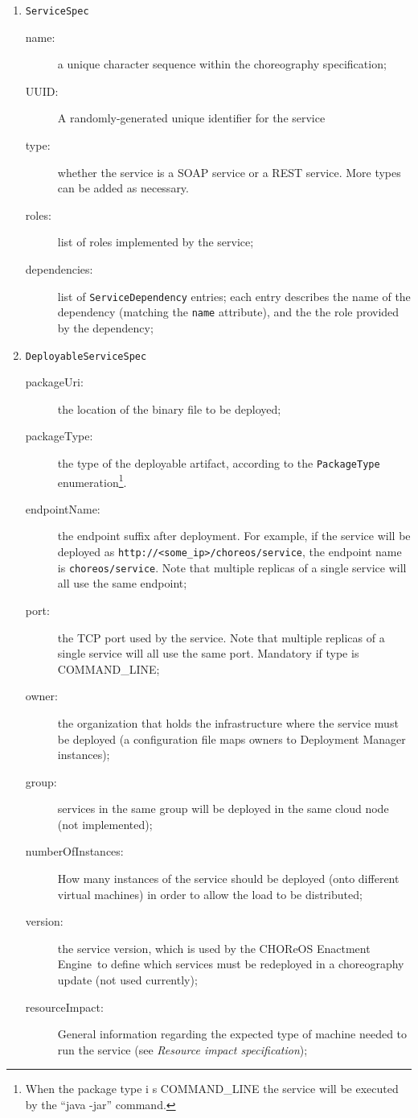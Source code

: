 \documentclass[a4paper, 10pt]{article}
\newcommand{\ee}{CHOReOS Enactment Engine}
\begin{document}
\begin{enumerate}

\item \verb!ServiceSpec!
	\begin{description}
		\item [name:] a unique character sequence within the choreography specification;
		\item [UUID:] A randomly-generated unique identifier for the service
		\item [type:] whether the service is a SOAP service or a REST service. More types can be added as necessary.
		\item [roles:] list of roles implemented by the service;
		\item [dependencies:] list of \verb!ServiceDependency! entries; each entry describes the name of the dependency (matching the \verb!name! attribute), and the the role provided by the dependency;
	\end{description}

\item \verb!DeployableServiceSpec!
	\begin{description}
		\item [packageUri:] the location of the binary file to be deployed;
		\item [packageType:] the type of the deployable artifact, according to the \verb!PackageType! enumeration\footnote{When the package type i    s COMMAND\_LINE the service will be executed by the ``java -jar'' command.}.
		\item [endpointName:] the endpoint suffix after deployment. For example, if the service will be deployed as \verb!http://<some_ip>/choreos/service!, the endpoint name is \verb!choreos/service!. Note that multiple replicas of a single service will all use the same endpoint;
		\item [port:] the TCP port used by the service. Note that multiple replicas of a single service will all use the same port. Mandatory if type is COMMAND\_LINE;
		\item [owner:] the organization that holds the infrastructure where the service must be deployed (a configuration file maps owners to Deployment Manager instances);
		\item [group:] services in the same group will be deployed in the same cloud node (not implemented);
		\item [numberOfInstances:] How many instances of the service should be deployed (onto different virtual machines) in order to allow the load to be distributed;
		\item [version:] the service version, which is used by the \ee\ to define which services must be redeployed in a choreography update (not used currently);
		\item [resourceImpact:] General information regarding the expected type of machine needed to run the service (see \emph{Resource impact specification});
	\end{description}


\end{enumerate}
\end{document}
